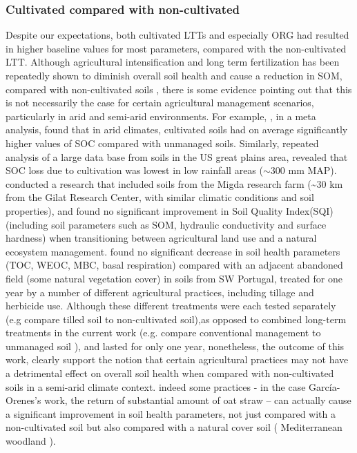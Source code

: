 \documentclass[12pt]{report}
\begin{document}
\subsubsection{Cultivated compared with non-cultivated}
Despite our expectations, both cultivated LTTs and especially ORG had resulted in higher baseline values for most parameters, compared with the non-cultivated LTT. Although agricultural intensification and long term fertilization has been repeatedly shown to diminish overall soil health and cause a reduction in SOM, compared with non-cultivated soils \citep{laurance2014, mganga2016, tilman2011}, there is some evidence pointing out that this is not necessarily the case for certain agricultural management scenarios, particularly in arid and semi-arid environments.  For example, \citet{trivedi2016}, in a meta analysis, found that in arid climates, cultivated soils had on average significantly higher values of SOC compared with unmanaged soils. Similarly, repeated analysis of a large data base from soils in the US great plains area, revealed that SOC loss due to cultivation was lowest in low rainfall areas ($ \sim $300 mm MAP)\citep{miller2004, burke1989}. \citet{paz-kagan2014} conducted a research that included soils from the Migda research farm (\~{}30 km from the Gilat Research Center, with similar climatic conditions and soil properties), and found no significant improvement in Soil Quality Index(SQI) (including soil parameters such as SOM, hydraulic conductivity and surface hardness) when transitioning between agricultural land use and a natural ecosystem management. \citet{garcia-orenes2010} found no significant decrease in soil health parameters (TOC, WEOC, MBC, basal respiration) compared with an adjacent abandoned field (some natural vegetation cover) in soils from SW Portugal, treated for one year by  a number of different agricultural practices, including tillage and herbicide use. Although these different treatments were each tested separately (e.g compare tilled soil to non-cultivated soil),as opposed to combined long-term treatments in the current work (e.g. compare conventional management to unmanaged soil ), and lasted for only one year, nonetheless, the outcome of this work, clearly support the notion that certain agricultural practices may not have a detrimental effect on overall soil health when compared with non-cultivated soils in a semi-arid climate context. indeed some practices - in the case García-Orenes’s work, the return of substantial amount of oat straw – can actually cause a significant improvement in soil health parameters, not just compared with a non-cultivated soil but also compared with a natural cover soil ( Mediterranean woodland ).\\
\end{document}
